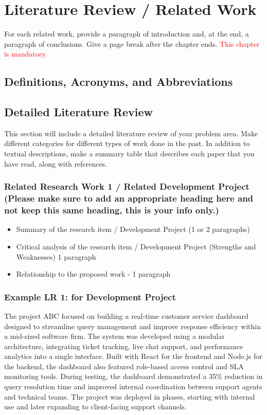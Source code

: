 \chapter{Literature Review / Related Work}
For each related work, provide a paragraph of introduction and, at the end, a paragraph of conclusions. Give a page break after the chapter ends. \textcolor{red}{This chapter is mandatory.}
\section{Definitions, Acronyms, and Abbreviations}
\section{Detailed Literature Review} 
This section will include a detailed literature review of your problem area. Make different categories for different types of work done in the past.  In addition to textual descriptions, make a summary table that describes each paper that you have read, along with references.
\subsection{Related Research Work 1 / Related Development Project (Please make sure to add an appropriate heading here and not keep this same heading, this is your info only.)}
\begin{itemize}
    \item Summary of the research item / Development Project (1 or 2 paragraphs)
  \item  Critical analysis of the research item / Development Project (Strengths and Weaknesses) 1 paragraph
  \item  Relationship to the proposed work - 1 paragraph
\end{itemize}

 \subsection{Example LR 1: for Development Project}
The project ABC \cite{ref:guyon:2007a} focused on building a real-time customer service dashboard designed to streamline query management and improve response efficiency within a mid-sized software firm. The system was developed using a modular architecture, integrating ticket tracking, live chat support, and performance analytics into a single interface. Built with React for the frontend and Node.js for the backend, the dashboard also featured role-based access control and SLA monitoring tools. During testing, the dashboard demonstrated a 35\% reduction in query resolution time and improved internal coordination between support agents and technical teams. The project was deployed in phases, starting with internal use and later expanding to client-facing support channels.


